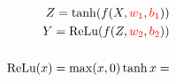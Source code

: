 \documentclass[10pt]{article}
\begin{document}
\begin{align*}Z = \tanh(f(X, \color{red}w_{1}\color{black}, \color{red}b_{1}\color{black}))\\
Y = \text{ReLu}(f(Z, \color{red}w_{2}\color{black}, \color{red}b_{2}\color{black}))\\
\\
\text{ReLu}(x) = \max(x, 0)
\tanh{x} = \end{align*}
\end{document}
